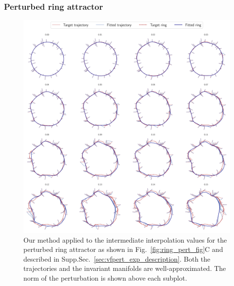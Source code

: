 \documentclass{article}
\theoremstyle{definition} \newtheorem{definition}{Definition}  \newtheorem{example}{Example}
\theoremstyle{remark} \newtheorem{remark}{Remark}
\newcounter{ct}
\begin{document}
\subsubsection{Perturbed ring attractor}
\begin{figure}[htbp]
    \centering
    \includegraphics[width=\linewidth]{perturbed_both_trajectories_asy}
    \caption{Our method applied to the intermediate interpolation values for the perturbed ring attractor as shown in Fig.~\ref{fig:ring_pert_fig}C and described in 
	Supp.Sec.~\ref{sec:vfpert_exp_description}.
	Both the trajectories and the invariant manifolds are well-approximated.
	The norm of the perturbation is shown above each subplot.
     }
    \label{fig:perturbed_both_trajectories_asy}
\end{figure}
\end{document}
